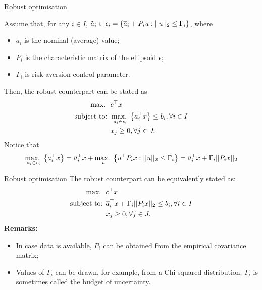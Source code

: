 \begin{frame}{Robust optimisation}

	Assume that,\hspace{-2pt} for\hspace{-2pt} any\hspace{-2pt} $i \in I$, $\tilde{a}_{i} \in \epsilon_i = \left\{ \overline{a}_i + P_iu : ||u||_2 \leq \Gamma_i \right \}$, where 
	\vspace{-6pt}
	
	\begin{itemize}
		\item $\overline{a}_{i}$ is the nominal (average) value; 
		\item $P_i$ is the characteristic matrix of the ellipsoid $\epsilon$;
		\item $\Gamma_i$ is risk-aversion control parameter.
	\end{itemize}
	\pause
	Then, the \alert{robust counterpart} can be stated as
	\begin{align*}
		\mathop{\text{max.} \ } \ &  c^\top x \\
		\mbox{subject to: } & \mathop{\text{max.} \ }_{a_{i} \in \epsilon_i}\left\{ a_i^\top x \right \} \leq b_i, \forall i \in I\\
		& x_j \geq 0, \forall j \in J.
	\end{align*}
	\vspace{-6pt}
	\pause
	Notice that 
	$$
	\mathop{\text{max.} \ }_{a_{i} \in \epsilon_i}\left\{ a_i^\top x \right \} = \overline{a}_i^\top x + \mathop{\text{max.} \ }_u\left\{ u^\top P_i x : ||u||_2 \leq \Gamma_i \right \} = \overline{a}_i^\top x + \Gamma_i||P_i x||_2 
	$$

\end{frame}


\begin{frame}{Robust optimisation}
	The \alert{robust counterpart} can be equivalently stated as:
	\begin{align*}
		\mathop{\text{max.} \ } \ &  c^\top x \\
		\mbox{subject to: } & \overline{a}_i^\top x + \Gamma_i||P_i x||_2 \leq b_i, \forall i \in I\\
		& x_j \geq 0, \forall j \in J.
	\end{align*}
	{\bf Remarks:}
	\begin{itemize}[<+->]
		\item In case data is available, $P_i$ can be obtained from the \alert{empirical covariance matrix};
		\item Values of $\Gamma_i$ can be drawn, for example, from a Chi-squared distribution. $\Gamma_i$ is sometimes called the \alert{budget of uncertainty}.
	\end{itemize}

\end{frame}


